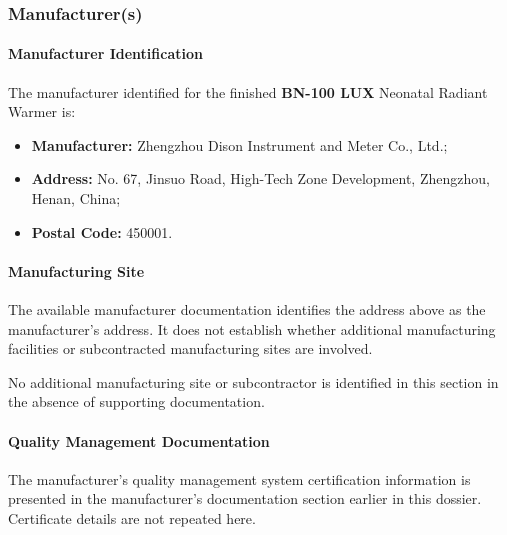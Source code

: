 ﻿

\hypertarget{p3-3-2-1}{}

\subsubsection{Manufacturer(s)}

\paragraph{Manufacturer Identification}

The manufacturer identified for the finished
\textbf{BN-100 LUX} Neonatal Radiant Warmer is:

\begin{itemize}
    \item \textbf{Manufacturer:} Zhengzhou Dison Instrument and Meter Co., Ltd.;
    \item \textbf{Address:} No. 67, Jinsuo Road, High-Tech Zone Development,
    Zhengzhou, Henan, China;
    \item \textbf{Postal Code:} 450001.
\end{itemize}

\paragraph{Manufacturing Site}

The available manufacturer documentation identifies the address
above as the manufacturer's address. It does not establish whether
additional manufacturing facilities or subcontracted manufacturing
sites are involved.

No additional manufacturing site or subcontractor is identified
in this section in the absence of supporting documentation.

\paragraph{Quality Management Documentation}

The manufacturer's quality management system certification
information is presented in the manufacturer's documentation
section earlier in this dossier. Certificate details are not
repeated here.

